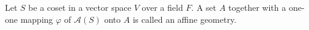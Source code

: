 Let $S$ be a coset in a vector space $V$ over a field $F$. A set $A$ together with a one-one mapping $\varphi$ of $\mathcal{A}(S)$ onto $A$ is called an affine geometry.
